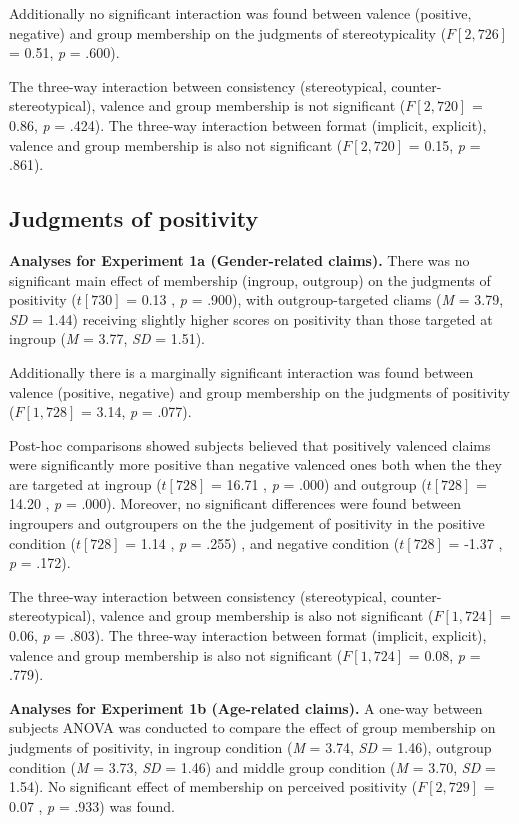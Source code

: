 \documentclass[man]{apa6}
\begin{document}
Additionally no significant interaction was found between valence
(positive, negative) and group membership on the judgments of
stereotypicality (\(F [2, 726]\) = 0.51, \emph{p} = .600).

The three-way interaction between consistency (stereotypical,
counter-stereotypical), valence and group membership is not significant
(\(F [2, 720]\) = 0.86, \emph{p} = .424). The three-way interaction
between format (implicit, explicit), valence and group membership is
also not significant (\(F [2, 720]\) = 0.15, \emph{p} = .861).

\subsection{\texorpdfstring{\textbf{Judgments of
positivity}}{Judgments of positivity}}\label{judgments-of-positivity}

\textbf{Analyses for Experiment 1a (Gender-related claims).} There was
no significant main effect of membership (ingroup, outgroup) on the
judgments of positivity (\(t [730]\) = 0.13 , \emph{p} = .900), with
outgroup-targeted cliams (\emph{M} = 3.79, \emph{SD} = 1.44) receiving
slightly higher scores on positivity than those targeted at ingroup
(\emph{M} = 3.77, \emph{SD} = 1.51).

Additionally there is a marginally significant interaction was found
between valence (positive, negative) and group membership on the
judgments of positivity (\(F [1, 728]\) = 3.14, \emph{p} = .077).

Post-hoc comparisons showed subjects believed that positively valenced
claims were significantly more positive than negative valenced ones both
when the they are targeted at ingroup (\(t [728]\) = 16.71 , \emph{p} =
.000) and outgroup (\(t [728]\) = 14.20 , \emph{p} = .000). Moreover, no
significant differences were found between ingroupers and outgroupers on
the the judgement of positivity in the positive condition (\(t [728]\) =
1.14 , \emph{p} = .255) , and negative condition (\(t [728]\) = -1.37 ,
\emph{p} = .172).

The three-way interaction between consistency (stereotypical,
counter-stereotypical), valence and group membership is also not
significant (\(F [1, 724]\) = 0.06, \emph{p} = .803). The three-way
interaction between format (implicit, explicit), valence and group
membership is also not significant (\(F [1, 724]\) = 0.08, \emph{p} =
.779).

\textbf{Analyses for Experiment 1b (Age-related claims).} A one-way
between subjects ANOVA was conducted to compare the effect of group
membership on judgments of positivity, in ingroup condition (\emph{M} =
3.74, \emph{SD} = 1.46), outgroup condition (\emph{M} = 3.73, \emph{SD}
= 1.46) and middle group condition (\emph{M} = 3.70, \emph{SD} = 1.54).
No significant effect of membership on perceived positivity
(\(F [2, 729]\) = 0.07 , \emph{p} = .933) was found.
\end{document}
